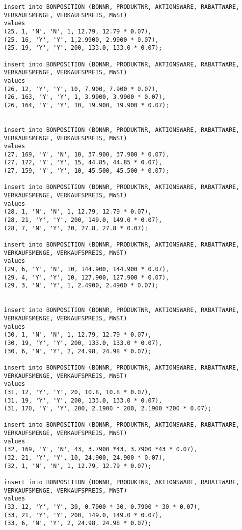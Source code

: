 \begin{lstlisting}
insert into BONPOSITION (BONNR, PRODUKTNR, AKTIONSWARE, RABATTWARE, VERKAUFSMENGE, VERKAUFSPREIS, MWST)
values
(25, 1, 'N', 'N', 1, 12.79, 12.79 * 0.07),
(25, 16, 'Y', 'Y', 1,2.9900, 2.9900 * 0.07),
(25, 19, 'Y', 'Y', 200, 133.0, 133.0 * 0.07);

insert into BONPOSITION (BONNR, PRODUKTNR, AKTIONSWARE, RABATTWARE, VERKAUFSMENGE, VERKAUFSPREIS, MWST)
values
(26, 12, 'Y', 'Y', 10, 7.900, 7.900 * 0.07),
(26, 163, 'Y', 'Y', 1, 3.9900, 3.9900 * 0.07),
(26, 164, 'Y', 'Y', 10, 19.900, 19.900 * 0.07);


insert into BONPOSITION (BONNR, PRODUKTNR, AKTIONSWARE, RABATTWARE, VERKAUFSMENGE, VERKAUFSPREIS, MWST)
values
(27, 169, 'Y', 'N', 10, 37.900, 37.900 * 0.07),
(27, 172, 'Y', 'Y', 15, 44.85, 44.85 * 0.07),
(27, 159, 'Y', 'Y', 10, 45.500, 45.500 * 0.07);

insert into BONPOSITION (BONNR, PRODUKTNR, AKTIONSWARE, RABATTWARE, VERKAUFSMENGE, VERKAUFSPREIS, MWST)
values
(28, 1, 'N', 'N', 1, 12.79, 12.79 * 0.07),
(28, 21, 'Y', 'Y', 200, 149.0, 149.0 * 0.07),
(28, 7, 'N', 'Y', 20, 27.8, 27.8 * 0.07);

insert into BONPOSITION (BONNR, PRODUKTNR, AKTIONSWARE, RABATTWARE, VERKAUFSMENGE, VERKAUFSPREIS, MWST)
values
(29, 6, 'Y', 'N', 10, 144.900, 144.900 * 0.07),
(29, 4, 'Y', 'Y', 10, 127.900, 127.900 * 0.07),
(29, 3, 'N', 'Y', 1, 2.4900, 2.4900 * 0.07);


insert into BONPOSITION (BONNR, PRODUKTNR, AKTIONSWARE, RABATTWARE, VERKAUFSMENGE, VERKAUFSPREIS, MWST)
values
(30, 1, 'N', 'N', 1, 12.79, 12.79 * 0.07),
(30, 19, 'Y', 'Y', 200, 133.0, 133.0 * 0.07),
(30, 6, 'N', 'Y', 2, 24.98, 24.98 * 0.07);

insert into BONPOSITION (BONNR, PRODUKTNR, AKTIONSWARE, RABATTWARE, VERKAUFSMENGE, VERKAUFSPREIS, MWST)
values
(31, 12, 'Y', 'Y', 20, 10.8, 10.8 * 0.07),
(31, 19, 'Y', 'Y', 200, 133.0, 133.0 * 0.07),
(31, 170, 'Y', 'Y', 200, 2.1900 * 200, 2.1900 *200 * 0.07);

insert into BONPOSITION (BONNR, PRODUKTNR, AKTIONSWARE, RABATTWARE, VERKAUFSMENGE, VERKAUFSPREIS, MWST)
values
(32, 169, 'Y', 'N', 43, 3.7900 *43, 3.7900 *43 * 0.07),
(32, 21, 'Y', 'Y', 10, 24.900, 24.900 * 0.07),
(32, 1, 'N', 'N', 1, 12.79, 12.79 * 0.07);

insert into BONPOSITION (BONNR, PRODUKTNR, AKTIONSWARE, RABATTWARE, VERKAUFSMENGE, VERKAUFSPREIS, MWST)
values
(33, 12, 'Y', 'Y', 30, 0.7900 * 30, 0.7900 * 30 * 0.07),
(33, 21, 'Y', 'Y', 200, 149.0, 149.0 * 0.07),
(33, 6, 'N', 'Y', 2, 24.98, 24.98 * 0.07);



\end{lstlisting}
